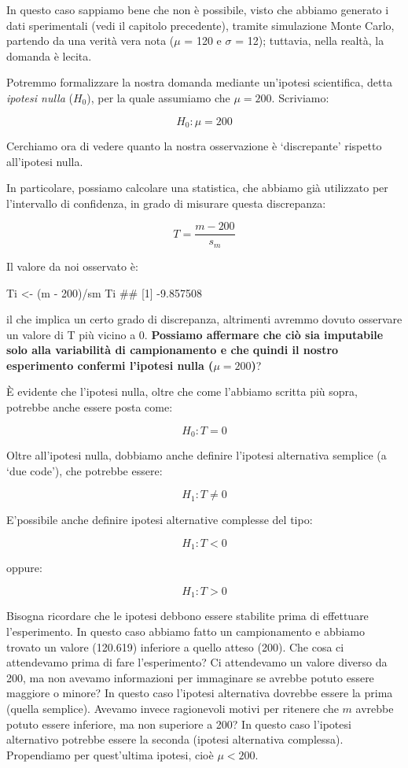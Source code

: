 \documentclass[a4paper,12pt,oneside]{book}
\newenvironment{Shaded}{}{}
\newcommand{\DecValTok}[1]{#1}
\newcommand{\StringTok}[1]{#1}
\newcommand{\CommentTok}[1]{#1}
\newcommand{\OperatorTok}[1]{#1}
\newcommand{\NormalTok}[1]{#1}
\begin{document}
In questo caso sappiamo bene che non è possibile, visto che abbiamo generato i dati sperimentali (vedi il capitolo precedente), tramite simulazione Monte Carlo, partendo da una verità vera nota (\(\mu\) = 120 e \(\sigma\) = 12); tuttavia, nella realtà, la domanda è lecita.

Potremmo formalizzare la nostra domanda mediante un'ipotesi scientifica, detta \emph{ipotesi nulla} (\(H_0\)), per la quale assumiamo che \(\mu = 200\). Scriviamo:

\[H_0: \mu = 200\]

Cerchiamo ora di vedere quanto la nostra osservazione è `discrepante' rispetto all'ipotesi nulla.

In particolare, possiamo calcolare una statistica, che abbiamo già utilizzato per l'intervallo di confidenza, in grado di misurare questa discrepanza:

\[ T = \frac{m - 200}{s_m} \]

Il valore da noi osservato è:

\begin{Shaded}
\begin{Highlighting}[]
\NormalTok{Ti <-}\StringTok{ }\NormalTok{(m }\OperatorTok{-}\StringTok{ }\DecValTok{200}\NormalTok{)}\OperatorTok{/}\NormalTok{sm}
\NormalTok{Ti}
\CommentTok{## [1] -9.857508}
\end{Highlighting}
\end{Shaded}

il che implica un certo grado di discrepanza, altrimenti avremmo dovuto osservare un valore di T più vicino a 0. \textbf{Possiamo affermare che ciò sia imputabile solo alla variabilità di campionamento e che quindi il nostro esperimento confermi l'ipotesi nulla (\(\mu = 200\))}?

È evidente che l'ipotesi nulla, oltre che come l'abbiamo scritta più sopra, potrebbe anche essere posta come:

\[H_0: T = 0\]

Oltre all'ipotesi nulla, dobbiamo anche definire l'ipotesi alternativa semplice (a `due code'), che potrebbe essere:

\[H_1: T \neq 0\]

E'possibile anche definire ipotesi alternative complesse del tipo:

\[H_1: T < 0\]

oppure:

\[H_1: T > 0\]

Bisogna ricordare che le ipotesi debbono essere stabilite prima di effettuare l'esperimento. In questo caso abbiamo fatto un campionamento e abbiamo trovato un valore (120.619) inferiore a quello atteso (200). Che cosa ci attendevamo prima di fare l'esperimento? Ci attendevamo un valore diverso da 200, ma non avevamo informazioni per immaginare se avrebbe potuto essere maggiore o minore? In questo caso l'ipotesi alternativa dovrebbe essere la prima (quella semplice). Avevamo invece ragionevoli motivi per ritenere che \(m\) avrebbe potuto essere inferiore, ma non superiore a 200? In questo caso l'ipotesi alternativo potrebbe essere la seconda (ipotesi alternativa complessa). Propendiamo per quest'ultima ipotesi, cioè \(\mu < 200\).
\end{document}
